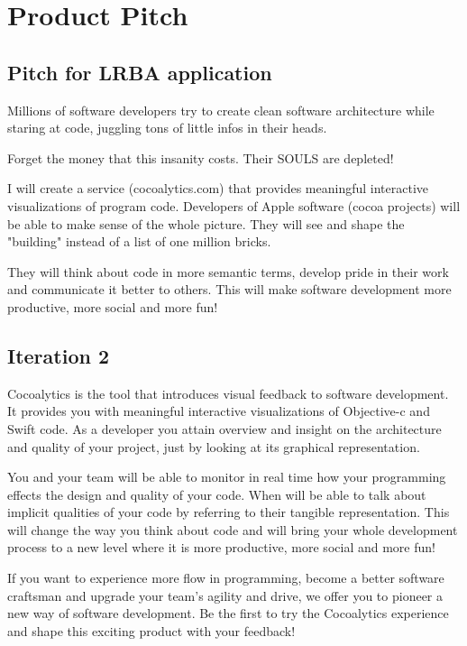 \documentclass{article}
\begin{document}
\section{Product Pitch}

\subsection{Pitch for LRBA application}

Millions of software developers try to create clean software architecture while staring at code, juggling tons of little infos in their heads.

Forget the money that this insanity costs. Their SOULS are depleted!

I will create a service (cocoalytics.com) that provides meaningful interactive visualizations of program code. Developers of Apple software (cocoa projects) will be able to make sense of the whole picture. They will see and shape the "building" instead of a list of one million bricks.

They will think about code in more semantic terms, develop pride in their work and communicate it better to others. This will make software development more productive, more social and more fun!

\subsection{Iteration 2}

Cocoalytics is the tool that introduces visual feedback to software development. It provides you with meaningful interactive visualizations of Objective-c and Swift code. As a developer you attain overview and insight on the architecture and quality of your project, just by looking at its graphical representation.

You and your team will be able to monitor in real time how your programming effects the design and quality of your code. When will be able to talk about implicit qualities of your code by referring to their tangible representation. This will change the way you think about code and will bring your whole development process to a new level where it is more productive, more social and more fun!

If you want to experience more flow in programming, become a better software craftsman and upgrade your team's agility and drive, we offer you to pioneer a new way of software development. Be the first to try the Cocoalytics experience and shape this exciting product with your feedback!
\end{document}
